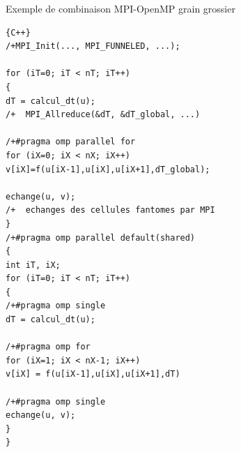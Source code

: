 \documentclass{beamer}
\begin{document}
\begin{frame}[fragile]
Exemple de combinaison MPI-OpenMP grain grossier


\begin{lstlisting}{C++}
/+MPI_Init(..., MPI_FUNNELED, ...);

for (iT=0; iT < nT; iT++)
{
dT = calcul_dt(u);
/+  MPI_Allreduce(&dT, &dT_global, ...)

/+#pragma omp parallel for
for (iX=0; iX < nX; iX++)
v[iX]=f(u[iX-1],u[iX],u[iX+1],dT_global);

echange(u, v);
/+  echanges des cellules fantomes par MPI  
}
/+#pragma omp parallel default(shared)
{
int iT, iX;
for (iT=0; iT < nT; iT++)
{
/+#pragma omp single
dT = calcul_dt(u);

/+#pragma omp for
for (iX=1; iX < nX-1; iX++)
v[iX] = f(u[iX-1],u[iX],u[iX+1],dT)

/+#pragma omp single
echange(u, v);
}
}
\end{lstlisting}

\end{frame}
\end{document}
